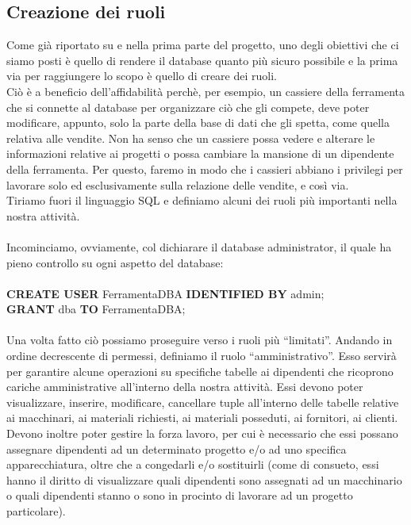 \documentclass[a4paper,12pt,italian]{article}
\begin{document}
\subsection{Creazione dei ruoli}
Come già riportato su e nella prima parte del progetto, uno degli obiettivi che ci siamo posti è quello di rendere il database quanto più sicuro possibile e la prima via per raggiungere lo scopo è quello di creare dei ruoli. \\
Ciò è a beneficio dell'affidabilità perchè, per esempio, un cassiere della ferramenta che si connette al database per organizzare ciò che gli compete, deve poter modificare, appunto, solo la parte della base di dati che gli spetta, come quella relativa alle vendite. Non ha senso che un cassiere possa vedere e alterare le informazioni relative ai progetti o possa cambiare la mansione di un dipendente della ferramenta. Per questo, faremo in modo che i cassieri abbiano i privilegi per lavorare solo ed esclusivamente sulla relazione delle vendite, e così via. \\
Tiriamo fuori il linguaggio SQL e definiamo alcuni dei ruoli più importanti nella nostra attività. \\ \\
Incominciamo, ovviamente, col dichiarare il database administrator, il quale ha pieno controllo su ogni aspetto del database: \\ \\
\textbf{CREATE USER} FerramentaDBA \textbf{IDENTIFIED BY} admin; \\
\textbf{GRANT} dba \textbf{TO} FerramentaDBA; \\ \\
Una volta fatto ciò possiamo proseguire verso i ruoli più “limitati”. 
Andando in ordine decrescente di permessi, definiamo il ruolo “amministrativo”. Esso servirà per garantire alcune operazioni su specifiche tabelle ai dipendenti che ricoprono cariche amministrative all'interno della nostra attività. Essi devono poter visualizzare, inserire, modificare, cancellare tuple all'interno delle tabelle relative ai macchinari, ai materiali richiesti, ai materiali posseduti, ai fornitori, ai clienti. Devono inoltre poter gestire la forza lavoro, per cui è necessario che essi possano assegnare dipendenti ad un determinato progetto e/o ad uno specifica apparecchiatura, oltre che a congedarli e/o sostituirli (come di consueto, essi hanno il diritto di visualizzare quali dipendenti sono assegnati ad un macchinario o quali dipendenti stanno o sono in procinto di lavorare ad un progetto particolare). \\
\end{document}
